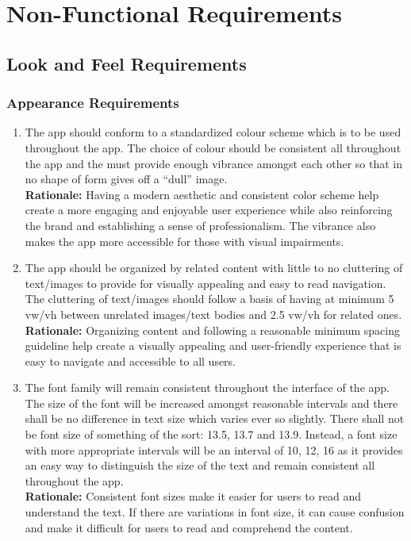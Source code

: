 \documentclass[]{article}
\begin{document}

\section{Non-Functional Requirements}
\label{sec:non-functional_requirements}

\subsection{Look and Feel Requirements}
\label{sub:look_and_feel_requirements}
\subsubsection{Appearance Requirements}
\label{ssub:appearance_requirements}
\begin{enumerate}[{LF-A}1. ]
	\item The app should conform to a standardized colour scheme which is to be used throughout the app. The choice of colour should be consistent all throughout the app and the must provide enough vibrance amongst each other so that in no shape of form gives off a “dull” image.\\
	{\bf Rationale:} Having a modern aesthetic and consistent color scheme help create a more engaging and enjoyable user experience while also reinforcing the brand and establishing a sense of professionalism. The vibrance also makes the app more accessible for those with visual impairments.
	\item The app should be organized by related content with little to no cluttering of text/images to provide for visually appealing and easy to read navigation. The cluttering of text/images should follow a basis of having at minimum 5 vw/vh between unrelated images/text bodies and 2.5 vw/vh for related ones.\\
	{\bf Rationale:} Organizing content and following a reasonable minimum spacing guideline help create a visually appealing and user-friendly experience that is easy to navigate and accessible to all users.
	\item The font family will remain consistent throughout the interface of the app. The size of the font will be increased amongst reasonable intervals and there shall be no difference in text size which varies ever so slightly.  There shall not be font size of something of the sort: 13.5, 13.7 and 13.9. Instead, a font size with more appropriate intervals will be an interval of 10, 12, 16 as it provides an easy way to distinguish the size of the text and remain consistent all throughout the app.\\
	{\bf Rationale:} Consistent font sizes make it easier for users to read and understand the text. If there are variations in font size, it can cause confusion and make it difficult for users to read and comprehend the content. 
\end{enumerate}
\end{document}
